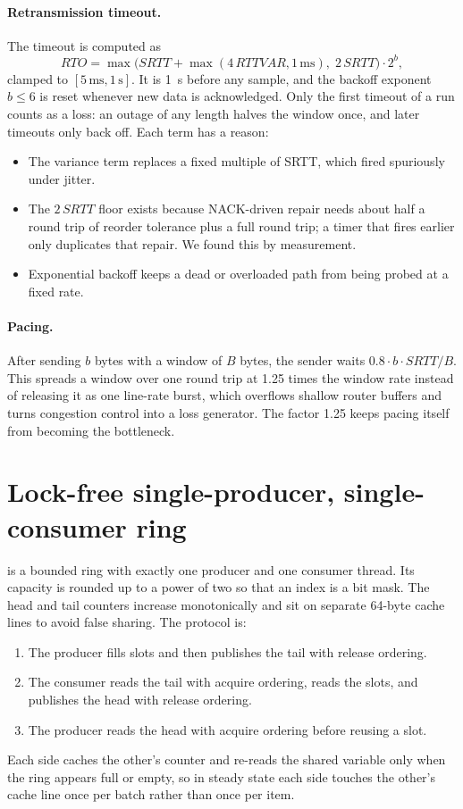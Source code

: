 \paragraph{Retransmission timeout\vviii.} The timeout is computed as
\[
\mathit{RTO}=\max\bigl(\mathit{SRTT}+\max(4\,\mathit{RTTVAR},1\,\mathrm{ms}),\;2\,\mathit{SRTT}\bigr)\cdot 2^{b},
\]
clamped to $[5\,\mathrm{ms}, 1\,\mathrm{s}]$. It is 1~s before any sample, and the backoff exponent $b\le6$ is
reset whenever new data is acknowledged. Only the first timeout of a run counts as a loss: an outage of any
length halves the window once, and later timeouts only back off. Each term has a reason:
\begin{itemize}
  \item The variance term replaces a fixed multiple of SRTT, which fired spuriously under jitter.
  \item The $2\,\mathit{SRTT}$ floor exists because NACK-driven repair needs about half a round trip of reorder
    tolerance plus a full round trip; a timer that fires earlier only duplicates that repair. We found this by
    measurement.
  \item Exponential backoff keeps a dead or overloaded path from being probed at a fixed rate.
\end{itemize}

\paragraph{Pacing\vviii.} After sending $b$ bytes with a window of $B$ bytes, the sender waits
$0.8\cdot b\cdot\mathit{SRTT}/B$. This spreads a window over one round trip at 1.25 times the window rate
instead of releasing it as one line-rate burst, which overflows shallow router buffers and turns congestion
control into a loss generator. The factor 1.25 keeps pacing itself from becoming the bottleneck.

\section{Lock-free single-producer, single-consumer ring}

 is a bounded ring with exactly one producer and one consumer thread. Its capacity is rounded
up to a power of two so that an index is a bit mask. The head and tail counters increase monotonically and sit
on separate 64-byte cache lines to avoid false sharing. The protocol is:
\begin{enumerate}
  \item The producer fills slots and then publishes the tail with release ordering.
  \item The consumer reads the tail with acquire ordering, reads the slots, and publishes the head with release
    ordering.
  \item The producer reads the head with acquire ordering before reusing a slot.
\end{enumerate}
Each side caches the other's counter and re-reads the shared variable only when the ring appears full or empty,
so in steady state each side touches the other's cache line once per batch rather than once per item.

